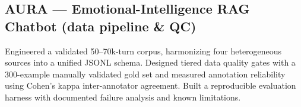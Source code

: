 \subsection{{AURA — Emotional-Intelligence RAG Chatbot (data pipeline \& QC) }}
\begin{zitemize}
\item Engineered a validated 50–70k-turn corpus, harmonizing four heterogeneous sources into a unified JSONL schema. Designed tiered data quality gates with a 300-example manually validated gold set and measured annotation reliability using Cohen's kappa inter-annotator agreement. Built a reproducible evaluation harness with documented failure analysis and known limitations.

\end{zitemize}